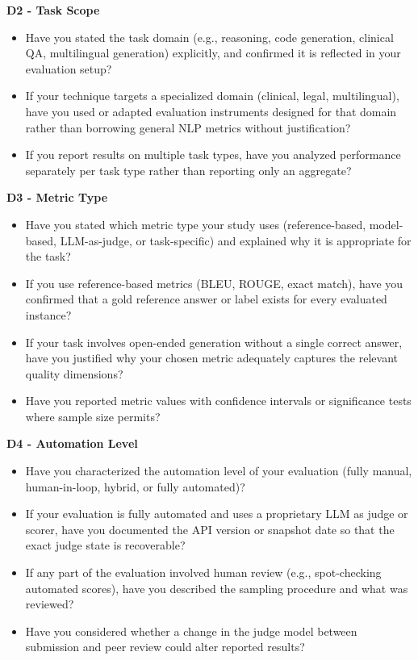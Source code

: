 \documentclass[acmsmall, nonacm, screen]{acmart}
\begin{document}
\textbf{D2 - Task Scope}
\begin{itemize}
  \item Have you stated the task domain (e.g., reasoning, code generation,
        clinical QA, multilingual generation) explicitly, and confirmed it
        is reflected in your evaluation setup?
  \item If your technique targets a specialized domain (clinical,
        legal, multilingual), have you used or adapted evaluation
        instruments designed for that domain rather than borrowing
        general NLP metrics without justification?
  \item If you report results on multiple task types, have you analyzed
        performance separately per task type rather than reporting only
        an aggregate?
\end{itemize}

\textbf{D3 - Metric Type}
\begin{itemize}
  \item Have you stated which metric type your study uses
        (reference-based, model-based, LLM-as-judge, or task-specific)
        and explained why it is appropriate for the task?
  \item If you use reference-based metrics (BLEU, ROUGE, exact match),
        have you confirmed that a gold reference answer or label exists
        for every evaluated instance?
  \item If your task involves open-ended generation without a single
        correct answer, have you justified why your chosen metric
        adequately captures the relevant quality dimensions?
  \item Have you reported metric values with confidence intervals or
        significance tests where sample size permits?
\end{itemize}

\textbf{D4 - Automation Level}
\begin{itemize}
  \item Have you characterized the automation level of your evaluation
        (fully manual, human-in-loop, hybrid, or fully automated)?
  \item If your evaluation is fully automated and uses a proprietary
        LLM as judge or scorer, have you documented the API version or
        snapshot date so that the exact judge state is recoverable?
  \item If any part of the evaluation involved human review (e.g.,
        spot-checking automated scores), have you described the
        sampling procedure and what was reviewed?
  \item Have you considered whether a change in the judge model between
        submission and peer review could alter reported results?
\end{itemize}
\end{document}
